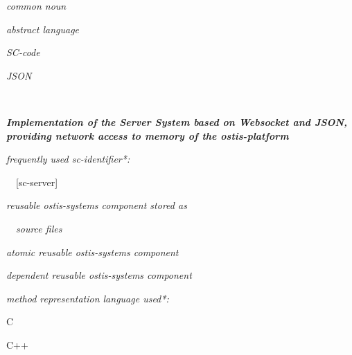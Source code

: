 \documentclass{article}
\begin{document}
\begin{multicols}{2}
\begin{description}[ labelwidth=0.75cm]
\begin{description}[ labelwidth=0.75cm]
\begin{description}[ labelwidth=0.75cm]
\item [:=] [The language we propose for interaction in a
distributed collective of ostis-systems]
 \begin{description}[ labelwidth=0.75cm]
   \item [$\in$] \textit{common noun}
   \columnbreak
\end{description}
\end{description}

\item [$\in$] \textit{abstract language}
   \item [\subset] \textit{SC-code}
   \item [\subset] \textit{JSON}
\par \ \par
\end{description}


\noindent\textbf{\textit{Implementation of the Server System based on
Websocket and JSON, providing network access to memory of the ostis-platform}}

\begin{description}[ labelwidth=0.75cm]
\vspace{-0.2cm} 
 \item [:=] [Implementation of a Websocket-based
 system that provides parallel-asynchronous multi-client
 access to sc-memory of the sc-model interpretation
platform using the SC-JSON code]

\item [:=] [sc-json-server]

\item [$\Rightarrow$] \textit{frequently used sc-identifier*:}\par
\ \ [sc-server]
\item [:=] [sc-server]

\item [$\in$] \textit{reusable ostis-systems component stored as}\par
\ \ \textit{source files}

\item [$\in$] \textit{atomic reusable ostis-systems component}

\item [$\in$] \textit{dependent reusable ostis-systems component}

\item [$\Rightarrow$] \textit{method representation language used*:}
\begin{description}[ labelwidth=0.75cm]
\item [•] C
\item [•] C++
\end{description}


\end{description}
\end{description}
\end{multicols}
\end{document}
